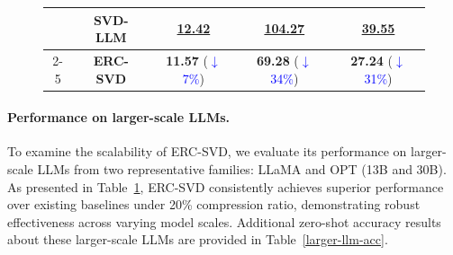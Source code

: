 \begin{figure}[h]
\begin{minipage}[t]{0.455\textwidth}
{\begin{tabular}{c|c|ccc}
                                               & \cellcolor{white} SVD-LLM & \cellcolor{white} \underline{12.42} & \cellcolor{white} \underline{104.27} & \cellcolor{white} \underline{39.55}\\
        \cmidrule{2-5}
                                               & \cellcolor{cyan!10} \textbf{ERC-SVD} & \cellcolor{cyan!10} \textbf{11.57} (\textcolor{blue}{$\downarrow$7\%}) & \cellcolor{cyan!10} \textbf{69.28} (\textcolor{blue}{$\downarrow$34\%}) & \cellcolor{cyan!10} \textbf{27.24} (\textcolor{blue}{$\downarrow$31\%})\\
        \bottomrule
    \end{tabular}
    }
    \vspace{-2pt}
    \vspace{1pt}
    \label{larger_scale_llms}
    \small
    \end{minipage}
\end{figure}

\paragraph{Performance on larger-scale LLMs.} 
To examine the scalability of ERC-SVD, we evaluate its performance on larger-scale LLMs from two representative families: LLaMA and OPT (13B and 30B).
As presented in Table~\ref{larger_scale_llms}, ERC-SVD consistently achieves superior performance over existing baselines under 20\% compression ratio, demonstrating robust effectiveness across varying model scales. Additional zero-shot accuracy results about these larger-scale LLMs are provided in Table~\ref{larger-llm-acc}.

